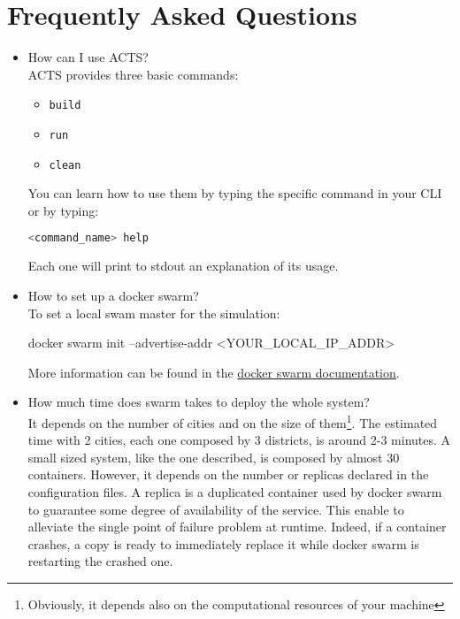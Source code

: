 \section{Frequently Asked Questions}

\begin{itemize}

\item How can I use ACTS?
\\

ACTS provides three basic commands:
\begin{itemize}
	\item \texttt{build}
	\item \texttt{run}
	\item \texttt{clean}
\end{itemize}
You can learn how to use them by typing the specific command in your CLI or
by typing:
\begin{lstlisting}[language=bash]
<command_name> help
\end{lstlisting}
Each one will print to stdout an explanation of its usage.

\item How to set up a docker swarm?
\\

To set a local swam master for the simulation:

docker swarm init --advertise-addr <YOUR\_LOCAL\_IP\_ADDR>

More information can be found in the \href{https://docs.docker.com/engine/swarm/swarm-tutorial/create-swarm/}{docker swarm documentation}.

\item How much time does swarm takes to deploy the whole system?
\\

It depends on the number of cities and on the size of them\footnote{Obviously,
it depends also on the computational resources of your machine}.
The estimated time with 2 cities, each one
composed by 3 districts, is around 2-3 minutes.
A small sized system, like
the one described, is composed by almost 30 containers.
However, it depends on the number or replicas declared in the configuration files.
A replica is a duplicated container used by docker swarm to guarantee some
degree of availability of the service. This enable to alleviate the single
point of failure problem at runtime. Indeed, if a container crashes, a copy
is ready to immediately replace it while docker swarm is restarting the crashed
one.

\end{itemize}

